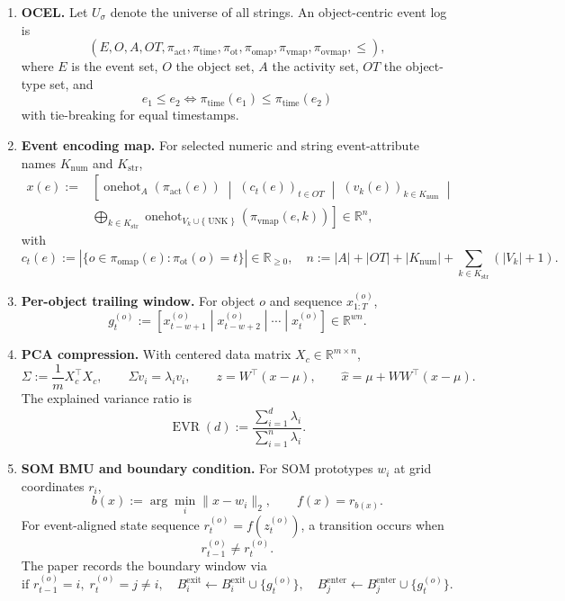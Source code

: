 \documentclass[a4paper,11pt]{article}
\newcommand{\R}{\mathbb{R}}
\newcommand{\onehot}{\operatorname{onehot}}
\begin{document}
\begin{enumerate}[label=(\alph*)]
\item \textbf{OCEL.} Let $U_\sigma$ denote the universe of all strings. An object-centric event log is
\[
(E,O,A,OT,\pi_{\mathrm{act}},\pi_{\mathrm{time}},\pi_{\mathrm{ot}},\pi_{\mathrm{omap}},
\pi_{\mathrm{vmap}},\pi_{\mathrm{ovmap}},\leq),
\]
where $E$ is the event set, $O$ the object set, $A$ the activity set, $OT$ the object-type set, and
\[
e_1 \leq e_2 \Longleftrightarrow \pi_{\mathrm{time}}(e_1)\leq \pi_{\mathrm{time}}(e_2)
\]
with tie-breaking for equal timestamps.
\item \textbf{Event encoding map.} For selected numeric and string event-attribute names $K_{\mathrm{num}}$ and $K_{\mathrm{str}}$,
\[
\begin{aligned}
x(e):={}&\left[
\onehot_A(\pi_{\mathrm{act}}(e)) \;\middle|\;
(c_t(e))_{t\in OT} \;\middle|\;
(v_k(e))_{k\in K_{\mathrm{num}}} \;\middle|\;\right.\\
&\left.\bigoplus_{k\in K_{\mathrm{str}}}
\onehot_{V_k\cup\{\operatorname{UNK}\}}(\pi_{\mathrm{vmap}}(e,k))
\right]\in\R^n,
\end{aligned}
\]
with
\[
c_t(e):=\left|\{o\in \pi_{\mathrm{omap}}(e):\pi_{\mathrm{ot}}(o)=t\}\right|\in\R_{\geq 0},
\quad
n:=|A|+|OT|+|K_{\mathrm{num}}|+\sum_{k\in K_{\mathrm{str}}}(|V_k|+1).
\]
\item \textbf{Per-object trailing window.} For object $o$ and sequence $x_{1:T}^{(o)}$,
\[
g_t^{(o)}:=\left[x_{t-w+1}^{(o)}\middle|x_{t-w+2}^{(o)}\middle|\cdots\middle|x_t^{(o)}\right]\in\R^{wn}.
\]
\item \textbf{PCA compression.} With centered data matrix $X_c\in\R^{m\times n}$,
\[
\Sigma:=\frac{1}{m}X_c^\top X_c,\qquad
\Sigma v_i=\lambda_i v_i,\qquad
z=W^\top(x-\mu),\qquad
\hat{x}=\mu+WW^\top(x-\mu).
\]
The explained variance ratio is
\[
\operatorname{EVR}(d):=\frac{\sum_{i=1}^{d}\lambda_i}{\sum_{i=1}^{n}\lambda_i}.
\]
\item \textbf{SOM BMU and boundary condition.} For SOM prototypes $w_i$ at grid coordinates $r_i$,
\[
b(x):=\arg\min_i\|x-w_i\|_2,\qquad f(x)=r_{b(x)}.
\]
For event-aligned state sequence $r_t^{(o)}=f(z_t^{(o)})$, a transition occurs when
\[
r_{t-1}^{(o)}\neq r_t^{(o)}.
\]
The paper records the boundary window via
\[
\text{if } r_{t-1}^{(o)}=i,\; r_t^{(o)}=j\neq i,\quad
B_i^{\mathrm{exit}}\leftarrow B_i^{\mathrm{exit}}\cup\{g_t^{(o)}\},\quad
B_j^{\mathrm{enter}}\leftarrow B_j^{\mathrm{enter}}\cup\{g_t^{(o)}\}.
\]
\end{enumerate}
\end{document}
